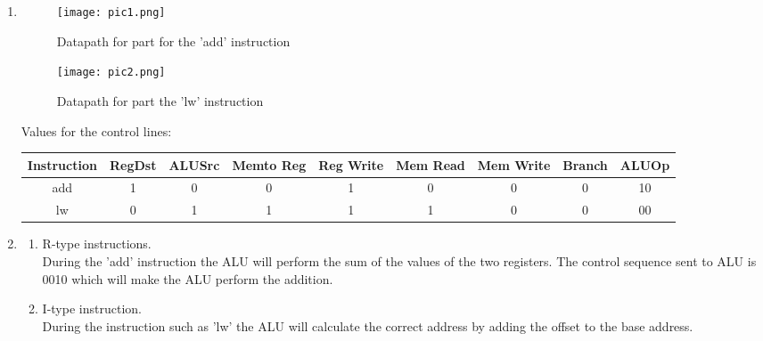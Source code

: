 \documentclass[a4paper]{article}
\begin{document}
\begin{enumerate}[label=(\alph*)]
\item 
	
\begin{figure}[!ht]
	\centering
	\texttt{[image: pic1.png]}
	\caption{Datapath for part for the 'add' instruction}
\end{figure}

\begin{figure}[!ht]
	\centering
	\texttt{[image: pic2.png]}
	\caption{Datapath for part the 'lw' instruction}
\end{figure}
\newpage

Values for the control lines:


\begin{table}[!ht]
	\centering
	\begin{tabular}{|c|c|c|c|c|c|c|c|c|}
		\hline
		Instruction & RegDst & ALUSrc & Memto Reg & Reg Write & Mem Read & Mem Write & Branch & ALUOp \\ \hline
		add         & 1      & 0      & 0         & 1         & 0        & 0         & 0      & 10    \\ \hline
		lw          & 0      & 1      & 1         & 1         & 1        & 0         & 0      & 00    \\ \hline
	\end{tabular}
\end{table}


\item 
\begin{enumerate}
	\item R-type instructions.\\
	 During the 'add' instruction the ALU will perform the sum of the values of the two registers. The control sequence sent to ALU is 0010 which will make the ALU perform the addition.
	
	\item I-type instruction.\\
	During the instruction such as 'lw' the ALU will calculate the correct address by adding the offset to the base address. 
\end{enumerate}
\end{enumerate}
\end{document}
